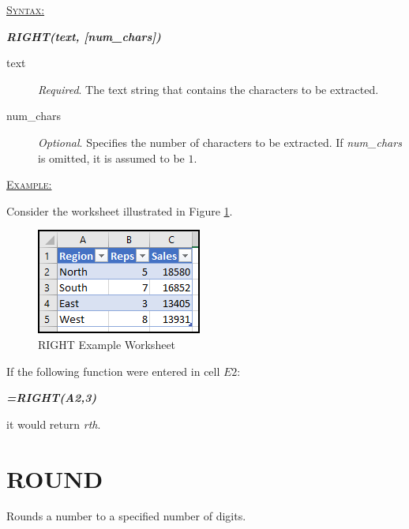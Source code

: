 \begin{addmargin}[1cm]{0cm}
	
	\medskip
	\underline{\textsc{Syntax:}}
	\medskip
	
	{\color{Syntax}
		\noindent\textbf{\textit{RIGHT(text, [num\_chars])}}
	}
	
	\begin{description}
		\item[text] \textit{Required}. The text string that contains the characters to be extracted.
		\item[num\_chars] \textit{Optional}. Specifies the number of characters to be extracted. If \textit{num\_chars} is omitted, it is assumed to be $ 1 $.
	\end{description}

	\medskip
	\noindent\underline{\textsc{Example:}}
	\medskip
	
	\noindent Consider the worksheet illustrated in Figure \ref{apa:rig}.
	
	\begin{figure}[H]
		\centering
		\includegraphics[width=\maxwidth{.45\linewidth}]{gfx/apa_fig01}
		\caption{RIGHT Example Worksheet}
		\label{apa:rig}
	\end{figure}
	
	\noindent If the following function were entered in cell $ E2 $:
	
	{\color{Syntax}
		\textit{\textbf{=RIGHT(A2,3)}}
	}
	
	\noindent it would return \textit{rth}.

\end{addmargin}

\section{ROUND}

Rounds a number to a specified number of digits.  

